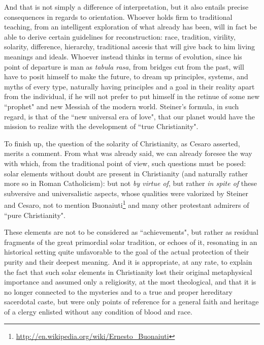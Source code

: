 And that is not simply a difference of interpretation, but it also entails precise consequences in regards to orientation. Whoever holds firm to traditional teaching, from an intelligent exploration of what already has been, will in fact be able to derive certain guidelines for reconstruction: race, tradition, virility, solarity, difference, hierarchy, traditional ascesis that will give back to him living meanings and ideals. Whoever instead thinks in terms of evolution, since his point of departure is man as \emph{tabula rasa}, from bridges cut from the past, will have to posit himself to make the future, to dream up principles, systems, and myths of every type, naturally having principles and a goal in their reality apart from the individual, if he will not prefer to put himself in the retinue of some new ``prophet" and new Messiah of the modern world. Steiner's formula, in such regard, is that of the ``new universal era of love", that our planet would have the mission to realize with the development of ``true Christianity".

To finish up, the question of the solarity of Christianity, as Cesaro asserted, merits a comment. From what was already said, we can already foresee the way with which, from the traditional point of view, such questions must be posed: solar elements without doubt are present in Christianity (and naturally rather more so in Roman Catholicism): but not \emph{by virtue of}, but rather \emph{in spite of} these subversive and universalistic aspects, whose qualities were valorized by Steiner and Cesaro, not to mention Buonaiuti\footnote{\url{http://en.wikipedia.org/wiki/Ernesto_Buonaiuti}} and many other protestant admirers of ``pure Christianity".

These elements are not to be considered as ``achievements", but rather as residual fragments of the great primordial solar tradition, or echoes of it, resonating in an historical setting quite unfavorable to the goal of the actual protection of their purity and their deepest meaning. And it is appropriate, at any rate, to explain the fact that such solar elements in Christianity lost their original metaphysical importance and assumed only a religiosity, at the most theological, and that it is no longer connected to the mysteries and to a true and proper hereditary sacerdotal caste, but were only points of reference for a general faith and heritage of a clergy enlisted without any condition of blood and race.

